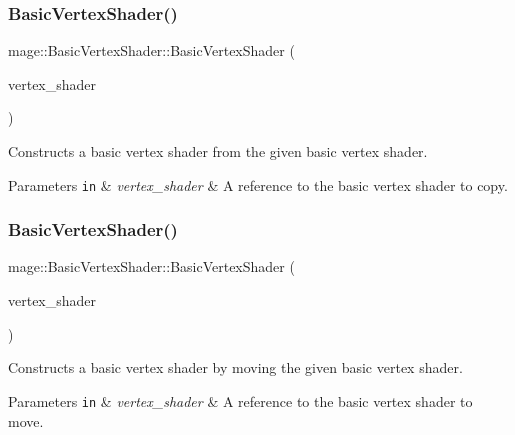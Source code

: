 \subsubsection{\texorpdfstring{Basic\+Vertex\+Shader()}{BasicVertexShader()}\hspace{0.1cm}{\footnotesize\ttfamily [3/4]}}
{\footnotesize\ttfamily mage\+::\+Basic\+Vertex\+Shader\+::\+Basic\+Vertex\+Shader (\begin{DoxyParamCaption}\item[{const \hyperlink{classmage_1_1_basic_vertex_shader}{Basic\+Vertex\+Shader} \&}]{vertex\+\_\+shader }\end{DoxyParamCaption})\hspace{0.3cm}{\ttfamily [delete]}}

Constructs a basic vertex shader from the given basic vertex shader.


\begin{DoxyParams}[1]{Parameters}
\mbox{\tt in}  & {\em vertex\+\_\+shader} & A reference to the basic vertex shader to copy. \\
\hline
\end{DoxyParams}
\hypertarget{classmage_1_1_basic_vertex_shader_a1c5f899e5dfaf81609e8e8fd73103ab2}{}\label{classmage_1_1_basic_vertex_shader_a1c5f899e5dfaf81609e8e8fd73103ab2} 
\subsubsection{\texorpdfstring{Basic\+Vertex\+Shader()}{BasicVertexShader()}\hspace{0.1cm}{\footnotesize\ttfamily [4/4]}}
{\footnotesize\ttfamily mage\+::\+Basic\+Vertex\+Shader\+::\+Basic\+Vertex\+Shader (\begin{DoxyParamCaption}\item[{\hyperlink{classmage_1_1_basic_vertex_shader}{Basic\+Vertex\+Shader} \&\&}]{vertex\+\_\+shader }\end{DoxyParamCaption})\hspace{0.3cm}{\ttfamily [default]}}

Constructs a basic vertex shader by moving the given basic vertex shader.


\begin{DoxyParams}[1]{Parameters}
\mbox{\tt in}  & {\em vertex\+\_\+shader} & A reference to the basic vertex shader to move. \\
\hline
\end{DoxyParams}
\hypertarget{classmage_1_1_basic_vertex_shader_ad155c4135f5517667020ec519a3597c9}{}\label{classmage_1_1_basic_vertex_shader_ad155c4135f5517667020ec519a3597c9} 
